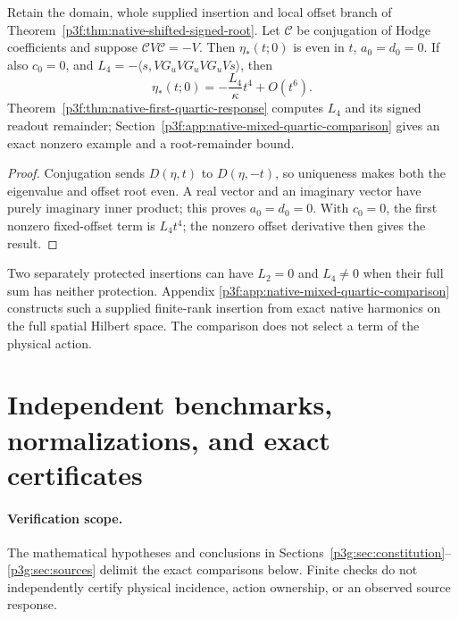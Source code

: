 \documentclass[11pt,a4paper]{article}
\begin{document}
\begin{corollary}
\label{p3f:cor:native-shift-fourth-displacement}
Retain the domain, whole supplied insertion and local offset branch of
Theorem~\ref{p3f:thm:native-shifted-signed-root}.
Let \(\mathcal C\) be conjugation of Hodge coefficients and suppose
\(\mathcal CV\mathcal C=-V\). Then \(\eta_*(t;0)\) is even in \(t\),
\(a_0=d_0=0\). If also \(c_0=0\), and
\(L_4=-\langle s,VG_uVG_uVG_uVs\rangle\), then
\[
 \eta_*(t;0)=-\frac{L_4}{\kappa}t^4+O(t^6).
\]
Theorem~\ref{p3f:thm:native-first-quartic-response} computes \(L_4\) and its signed
readout remainder; Section~\ref{p3f:app:native-mixed-quartic-comparison} gives an exact
nonzero example and a root-remainder bound.
\end{corollary}
\begin{proof}
Conjugation sends \(D(\eta,t)\) to \(D(\eta,-t)\), so uniqueness
makes both the eigenvalue and offset root even. A real vector and an
imaginary vector have purely imaginary inner product; this proves
\(a_0=d_0=0\). With \(c_0=0\), the first nonzero fixed-offset term
is \(L_4t^4\); the nonzero offset derivative then gives the result.
\end{proof}

Two separately protected insertions can have \(L_2=0\) and
\(L_4\ne0\) when their full sum has neither protection. Appendix
\ref{p3f:app:native-mixed-quartic-comparison} constructs such a supplied
finite-rank insertion from exact native harmonics on the full spatial
Hilbert space. The comparison does not select a term of the physical action.




\section{Independent benchmarks, normalizations, and exact certificates}
\label{p3g:sec:verification}
\paragraph{Verification scope.} The mathematical hypotheses and conclusions
in Sections~\ref{p3g:sec:constitution}--\ref{p3g:sec:sources} delimit the exact comparisons below.
Finite checks do not independently certify physical incidence,
action ownership, or an observed source response.
\end{document}
